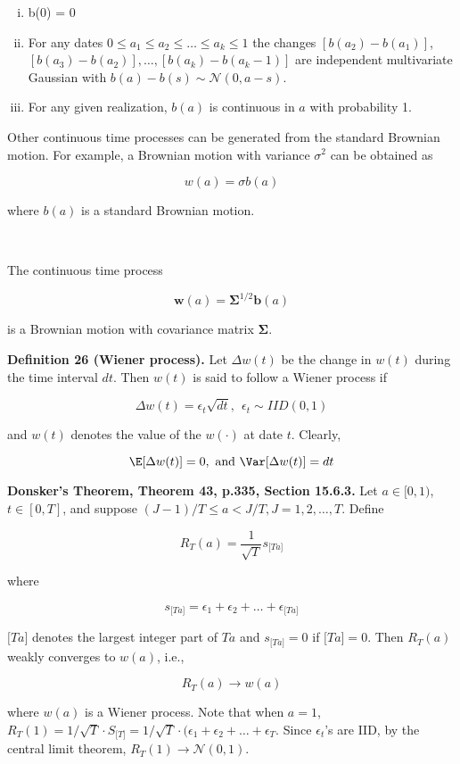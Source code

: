 \begin{enumerate}[(i)]

\item b(0) = 0

\item For any dates \(0 \leq a_1 \leq a_2 \leq \ldots \leq a_k \leq 1\) the changes \([b(a_2) - b(a_1)]\), \([b(a_3) - b(a_2)], \ldots, [b(a_k) - b(a_k - 1)]\) are independent multivariate Gaussian with \(b(a) - b(s) \sim \mathcal{N}(0, a -s)\). 

\item For any given realization, \(b(a)\) is continuous in \(a\) with probability 1.

\end{enumerate}

Other continuous time processes can be generated from the standard Brownian motion. For example, a Brownian motion with variance \(\sigma^2\) can be obtained as

\[
w(a) = \sigma b(a)
\]

where \(b(a)\) is a standard Brownian motion.

\

The continuous time process

\[
\boldsymbol{w}(a) = \boldsymbol{\Sigma}^{1/2} \boldsymbol{b}(a)
\]

is a Brownian motion with covariance matrix \(\boldsymbol{\Sigma}\).

\textbf{Definition 26 (Wiener process).} Let \(\Delta w(t)\) be the change in \(w(t)\) during the time interval \(dt\). Then \(w(t)\) is said to follow a Wiener process if

\[
\Delta w(t) = \epsilon_t \sqrt{dt}, \ \ \epsilon_t \sim IID(0, 1)
\]

and \(w(t)\) denotes the value of the \(w(\cdot)\) at date \(t\). Clearly,

\[
\E[\Delta w(t)] = 0, \text{ and } \Var[ \Delta w(t)] = dt
\]

\begin{theorem}\label{stoch.donsker}\textbf{Donsker's Theorem, Theorem 43, p.335, Section 15.6.3.} Let \(a \in [0, 1)\), \(t \in [0, T]\), and suppose \((J - 1)/T \leq a < J/T, J = 1, 2, \ldots, T\). Define

\[
R_T(a) = \frac{1}{\sqrt{T}} s_{ \big[Ta \big] }
\]

where

\[
s_{ \big[Ta \big] } = \epsilon_1 + \epsilon_2 + \ldots + \epsilon_{ \big[Ta \big] }
\]

\(\big[Ta \big]\) denotes the largest integer part of \(Ta\) and \(s_{ \big[Ta \big] } = 0\) if \(\big[Ta \big] = 0\). Then \(R_T(a)\) weakly converges to \(w(a)\), i.e., 

\[
R_T(a) \to w(a)
\]

where \(w(a)\) is a Wiener process. Note that when \(a = 1\), \(R_T(1) = 1/\sqrt{T} \cdot S_{\big[T \big]} = 1/\sqrt{T} \cdot (\epsilon_1 + \epsilon_2 + \ldots + \epsilon_T\). Since \(\epsilon_t\)'s are IID, by the central limit theorem, \(R_T(1) \to \mathcal{N}(0, 1)\). 

\end{theorem}


